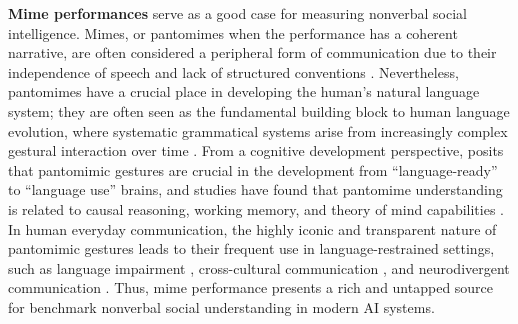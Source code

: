 \textbf{Mime performances} serve as a good case for measuring nonverbal social intelligence. Mimes, or pantomimes when the performance has a coherent narrative, are often considered a peripheral form of communication due to their independence of speech and lack of structured conventions \cite{mcneill2008gesture, mcneill2012language}. Nevertheless, pantomimes have a crucial place in developing the human's natural language system; they are often seen as the fundamental building block to human language evolution, where systematic grammatical systems arise from increasingly complex gestural interaction over time \cite{kendon2017reflections, mineiro2017emerging, zlatev2020pantomime, ferretti2023influence}. From a cognitive development perspective, \citet{arbib2017toward, arbib2024pantomime} posits that pantomimic gestures are crucial in the development from ``language-ready'' to ``language use'' brains, and studies have found that pantomime understanding is related to causal reasoning, working memory, and theory of mind capabilities \cite{adornetti2023comprehending, gardenfors2024relations}. In human everyday communication, the highly iconic and transparent nature of pantomimic gestures leads to their frequent use in language-restrained settings, such as language impairment \cite{fex1998use, goldin2005resilience}, cross-cultural communication \cite{ortega2020types, zywiczynski2021pantomimic}, and neurodivergent communication \cite{yavuz2019social}. Thus, mime performance presents a rich and untapped source for benchmark nonverbal social understanding in modern AI systems.